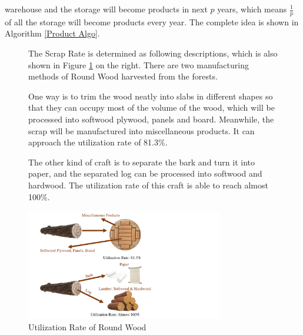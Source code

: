 \documentclass{mcmthesis}
\numberwithin{figure}{section}
\numberwithin{table}{section}
\numberwithin{equation}{section}
\begin{document}
warehouse and the storage will become products in next $ p $ years, which means 
 $ \frac{1}{p} $ of all the storage will become products every year.
The complete idea is shown in Algorithm \ref{Product Algo}.
\par
\begin{figure}[ht]
  \begin{minipage}[htbp]{0.42\linewidth}
    The Scrap Rate is determined as following descriptions, which is also shown 
    in Figure \ref{RoundWood} on the right. There are two 
    manufacturing methods of Round Wood harvested from the forests. 
    \par
    One way is to trim the wood neatly into slabs in different shapes so that they can
    occupy most of the volume of the wood, which will be processed into softwood plywood, 
    panels and board. Meanwhile, the scrap will be manufactured into miscellaneous 
    products. It can approach the utilization rate of 81.3\%.
    \par
    The other kind of craft is to separate the bark and turn it into paper, and 
    the separated log can be processed into softwood and hardwood. The utilization 
    rate of this craft is able to reach almost 100\%.
  \end{minipage}
  \hfill
  \begin{minipage}[htbp]{0.5\linewidth}
    \begin{flushright}
      \includegraphics[width = 8.61cm]{code&pic/Roundwood cutting ways.pdf}
      \caption{Utilization Rate of Round Wood}\label{RoundWood}
    \end{flushright}
  \end{minipage}
\end{figure}
\end{document}
